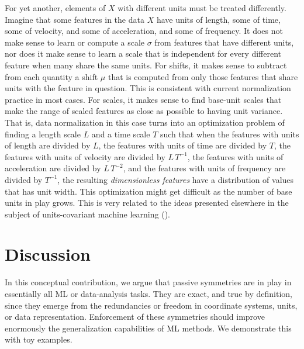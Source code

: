 \documentclass[preprint]{article} %
\begin{document}
For yet another, elements of $X$ with different units must be treated differently.
Imagine that some features in the data $X$ have units of length, some of time, some of velocity, and some of acceleration, and some of frequency.
It does not make sense to learn or compute a scale $\sigma$ from features that have different units, nor does it make sense to learn a scale that is independent for every different feature when many share the same units.
For shifts, it makes sense to subtract from each quantity a shift $\mu$ that is computed from only those features that share units with the feature in question.
This is consistent with current normalization practice in most cases.
For scales, it makes sense to find base-unit scales that make the range of scaled features as close as possible to having unit variance.
That is, data normalization in this case turns into an optimization problem of finding a length scale $L$ and a time scale $T$ such that when the features with units of length are divided by $L$, the features with units of time are divided by $T$, the features with units of velocity are divided by $L\,T^{-1}$, the features with units of acceleration are divided by $L\,T^{-2}$, and the features with units of frequency are divided by $T^{-1}$, the resulting \emph{dimensionless features} have a distribution of values that has unit width.
This optimization might get difficult as the number of base units in play grows.
This is very related to the ideas presented elsewhere in the subject of units-covariant machine learning (\citealt{villar2022dimensionless}).

\section{Discussion}\label{sec:discussion}
In this conceptual contribution,
we argue that passive symmetries are in play in essentially all ML or data-analysis tasks.
They are exact, and true by definition, since they emerge from the redundancies or freedom in coordinate systems, units, or data representation.
Enforcement of these symmetries should improve enormously the generalization capabilities of ML methods.
We demonstrate this with toy examples.
\end{document}
